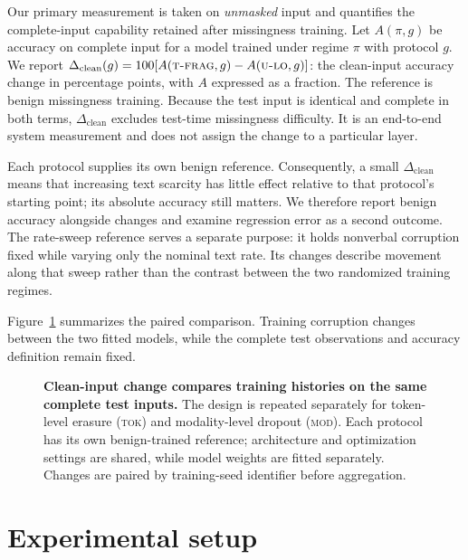 \documentclass[preprint,11pt]{elsarticle}
\newcommand{\IMM}{\textsc{tok}}          %
\newcommand{\FMM}{\textsc{mod}}          %
\newcommand{\degr}{\ensuremath{\Delta_{\mathrm{clean}}}}  %
\begin{document}
Our primary measurement is taken on \emph{unmasked} input and quantifies the
complete-input capability retained after missingness training. Let $A(\pi,g)$
be accuracy on complete input for a model trained under regime $\pi$ with
protocol $g$. We report
$\degr(g) = 100[A(\textsc{t-frag},g) - A(\textsc{u-lo},g)]$:
the clean-input accuracy change in percentage points, with $A$ expressed as a
fraction. The reference is benign missingness training. Because the test
input is identical and complete in both
terms, $\degr$ excludes test-time missingness difficulty. It is an end-to-end
system measurement and does not assign the change to a particular layer.

Each protocol supplies its own benign reference. Consequently, a small
$\degr$ means that increasing text scarcity has little effect relative to
that protocol's starting point; its absolute accuracy still matters. We
therefore report benign accuracy alongside changes and examine regression
error as a second outcome. The rate-sweep reference serves a separate
purpose: it holds nonverbal corruption fixed while varying only the nominal
text rate. Its changes describe movement along that sweep rather than the
contrast between the two randomized training regimes.

Figure~\ref{fig:study_design} summarizes the paired comparison. Training
corruption changes between the two fitted models, while the complete test
observations and accuracy definition remain fixed.

\begin{figure}[!htbp]
  \centering
  
  \caption{\textbf{Clean-input change compares training histories on the same
  complete test inputs.} The design is repeated separately for token-level
  erasure (\IMM{}) and modality-level dropout (\FMM{}). Each protocol has
  its own benign-trained reference; architecture and optimization settings are
  shared, while model weights are fitted separately. Changes are paired by
  training-seed identifier before aggregation.}
  \label{fig:study_design}
\end{figure}

\section{Experimental setup}\label{sec:setup}
\end{document}
